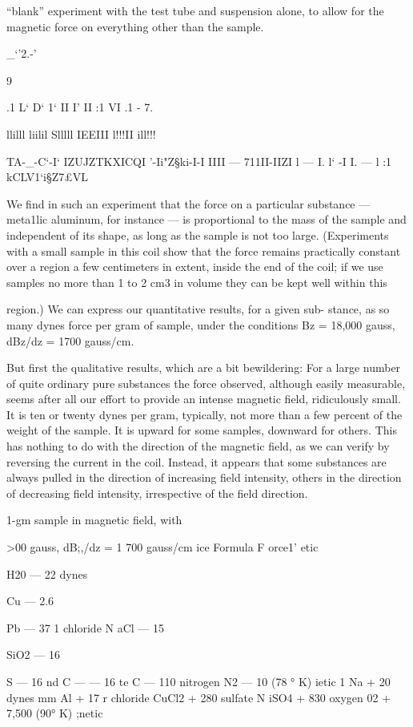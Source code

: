 ``blank'' experiment with the test tube and suspension alone, to allow
for the magnetic force on everything other than the sample.

_‘'2.-'{ 9

.1 L‘
D‘ 1‘
II I'
II :1
VI .1
- 7.

llilll
liilil
Slllll
IEEIII
l!!!II
ill!!!

TA-_-C‘-I‘
IZUJZTKXICQI
'-Ii"Z§ki-I-I
IIII --- 711II-IIZI
\-l ---  I. l‘ -I I.  --- l :1
kCLV1‘i§Z7£VL

We find in such an experiment that the force on a particular
substance --- meta1lic aluminum, for instance --- is proportional to the
mass of the sample and independent of its shape, as long as the
sample is not too large. (Experiments with a small sample in this
coil show that the force remains practically constant over a region a
few centimeters in extent, inside the end of the coil; if we use samples
no more than 1 to 2 cm3 in volume they can be kept well within this

region.) We can express our quantitative results, for a given sub-
stance, as so many dynes force per gram of sample, under the conditions
Bz = 18,000 gauss, dBz/dz = 1700 gauss/cm.

But first the qualitative results, which are a bit bewildering: For
a large number of quite ordinary pure substances the force observed,
although easily measurable, seems after all our effort to provide an
intense magnetic field, ridiculously small. It is ten or twenty dynes
per gram, typically, not more than a few percent of the weight of the
sample. It is upward for some samples, downward for others. This
has nothing to do with the direction of the magnetic field, as we can
verify by reversing the current in the coil. Instead, it appears that
some substances are always pulled in the direction of increasing field
intensity, others in the direction of decreasing field intensity, irrespective
of the field direction.

1-gm sample in magnetic field, with

>00 gauss, dB;,/dz = 1 700 gauss/cm
ice Formula F orce1'
etic

H20  ---  22 dynes

Cu  ---  2.6

Pb  ---  37
1 chloride N aCl  ---  15

SiO2  ---  16

S  ---  16
nd C  ---  ---  16
te C  ---  110
nitrogen N2  ---  10 (78 ° K)
ietic
1 Na + 20 dynes
mm Al + 17
r chloride CuCl2 + 280
sulfate N iSO4 + 830
oxygen 02 + 7,500 (90° K)
;netic

}
